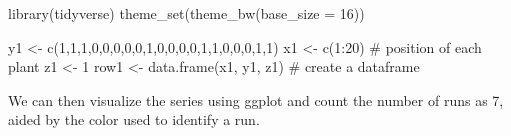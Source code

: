 \documentclass[
  letterpaper,
]{book}
\newenvironment{Shaded}{\begin{snugshade}}{\end{snugshade}}
\newcommand{\AttributeTok}[1]{\textcolor[rgb]{0.40,0.45,0.13}{#1}}
\newcommand{\CommentTok}[1]{\textcolor[rgb]{0.37,0.37,0.37}{#1}}
\newcommand{\DecValTok}[1]{\textcolor[rgb]{0.68,0.00,0.00}{#1}}
\newcommand{\FunctionTok}[1]{\textcolor[rgb]{0.28,0.35,0.67}{#1}}
\newcommand{\NormalTok}[1]{\textcolor[rgb]{0.00,0.23,0.31}{#1}}
\newcommand{\OtherTok}[1]{\textcolor[rgb]{0.00,0.23,0.31}{#1}}
\newcommand{\SpecialCharTok}[1]{\textcolor[rgb]{0.37,0.37,0.37}{#1}}
\begin{document}
\begin{Shaded}
\begin{Highlighting}[]
\FunctionTok{library}\NormalTok{(tidyverse) }
\FunctionTok{theme\_set}\NormalTok{(}\FunctionTok{theme\_bw}\NormalTok{(}\AttributeTok{base\_size =} \DecValTok{16}\NormalTok{))}
\end{Highlighting}
\end{Shaded}

\begin{Shaded}
\begin{Highlighting}[]
\NormalTok{y1 }\OtherTok{\textless{}{-}} \FunctionTok{c}\NormalTok{(}\DecValTok{1}\NormalTok{,}\DecValTok{1}\NormalTok{,}\DecValTok{1}\NormalTok{,}\DecValTok{0}\NormalTok{,}\DecValTok{0}\NormalTok{,}\DecValTok{0}\NormalTok{,}\DecValTok{0}\NormalTok{,}\DecValTok{0}\NormalTok{,}\DecValTok{1}\NormalTok{,}\DecValTok{0}\NormalTok{,}\DecValTok{0}\NormalTok{,}\DecValTok{0}\NormalTok{,}\DecValTok{0}\NormalTok{,}\DecValTok{1}\NormalTok{,}\DecValTok{1}\NormalTok{,}\DecValTok{0}\NormalTok{,}\DecValTok{0}\NormalTok{,}\DecValTok{0}\NormalTok{,}\DecValTok{1}\NormalTok{,}\DecValTok{1}\NormalTok{)}
\NormalTok{x1 }\OtherTok{\textless{}{-}} \FunctionTok{c}\NormalTok{(}\DecValTok{1}\SpecialCharTok{:}\DecValTok{20}\NormalTok{) }\CommentTok{\# position of each plant}
\NormalTok{z1 }\OtherTok{\textless{}{-}} \DecValTok{1}
\NormalTok{row1 }\OtherTok{\textless{}{-}} \FunctionTok{data.frame}\NormalTok{(x1, y1, z1) }\CommentTok{\# create a dataframe}
\end{Highlighting}
\end{Shaded}

We can then visualize the series using ggplot and count the number of
runs as 7, aided by the color used to identify a run.
\end{document}
